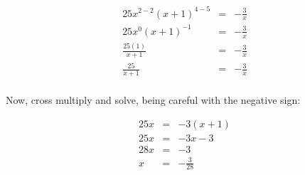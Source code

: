 \documentclass[letterpaper, 12pt]{article}
\begin{document}
\begin{eqnarray*}
25x^{2-2}(x+1)^{4-5} &=& -\frac{3}{x} \\
25x^0(x+1)^{-1} &=& -\frac{3}{x} \\
\frac{25(1)}{x+1} &=& -\frac{3}{x} \\
\frac{25}{x+1} &=& -\frac{3}{x} \\
\end{eqnarray*}

Now, cross multiply and solve, being careful with the negative sign:

\begin{eqnarray*}
25x &=& -3(x+1) \\
25x &=& -3x-3 \\
28x &=& -3 \\
x &=& -\frac{3}{28} \\
\end{eqnarray*}
\end{document}
